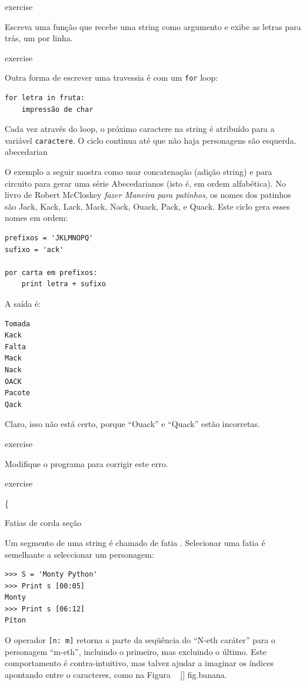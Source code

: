 \documentclass[10pt]{book}
\begin{document}
\begin{exercise}
{\begin{} exercise

Escreva uma função que recebe uma string como argumento
e exibe as letras para trás, um por linha.

\end{} exercise

Outra forma de escrever uma travessia é com um {\tt for} loop:

\begin{verbatim}
for letra in fruta:
    impressão de char
\end{verbatim}
%
Cada vez através do loop, o próximo caractere na string é atribuído
para a variável {\tt caractere}. O ciclo continua até que não haja personagens são
esquerda.
\index{} abecedarian

O exemplo a seguir mostra como usar concatenação (adição string)
e {\tt} para circuito para gerar uma série Abecedarianos (isto é, em
ordem alfabética). No livro de Robert McCloskey {\em fazer
Maneira para patinhos}, os nomes dos patinhos são Jack, Kack, Lack,
Mack, Nack, Ouack, Pack, e Quack. Este ciclo gera esses nomes em
ordem:

\begin{verbatim}
prefixos = 'JKLMNOPQ'
sufixo = 'ack'

por carta em prefixos:
    print letra + sufixo
\end{verbatim}
%
A saída é:

\begin{verbatim}
Tomada
Kack
Falta
Mack
Nack
OACK
Pacote
Qack
\end{verbatim}
%
Claro, isso não está certo, porque ``Ouack'' e
``Quack'' estão incorretas.

\begin{} exercise

Modifique o programa para corrigir este erro.

\end{} exercise



\{} Fatias de corda seção
\label{fatia}

Um segmento de uma string é chamado de fatia {\bf}. Selecionar uma fatia é
semelhante a seleccionar um personagem:

\begin{verbatim}
>>> S = 'Monty Python'
>>> Print s [00:05]
Monty
>>> Print s [06:12]
Píton
\end{verbatim}
%
O operador {\tt [n: m]} retorna a parte da seqüência do 
``N-eth caráter'' para o personagem ``m-eth'', incluindo o primeiro, mas
excluindo o último. Este comportamento é contra-intuitivo, mas talvez
ajudar a imaginar os índices apontando {\em} entre o
caracteres, como na Figura ~ \ref {} fig.banana.


\end{exercise}
\end{document}
